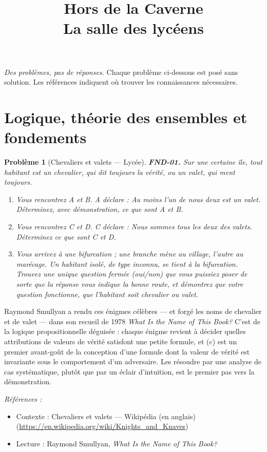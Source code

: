 \documentclass[11pt]{article}
\title{Hors de la Caverne \\ \Large La salle des lycéens}
\author{}
\date{}
\newtheorem{problem}{Problème}
\newenvironment{refs}{\par\small\noindent\emph{Références :}\begin{itemize}\setlength\itemsep{0pt}}{\end{itemize}\normalsize}
\begin{document}
\maketitle
\noindent\emph{Des problèmes, pas de réponses.} Chaque problème ci-dessous est posé
sans solution. Les références indiquent où trouver les connaissances nécessaires.
\medskip


\section*{Logique, théorie des ensembles et fondements}

\begin{problem}[{Chevaliers et valets --- Lycée}]
\textbf{FND-01.} Sur une certaine île, tout habitant est un \textit{chevalier},
qui dit toujours la vérité, ou un \textit{valet}, qui ment toujours.
\begin{enumerate}
\item[(a)] Vous rencontrez A et B. A déclare :
\og{} Au moins l'un de nous deux est un valet. \fg{} Déterminez, avec démonstration, ce que sont A et B.
\item[(b)] Vous rencontrez C et D.
C déclare : \og{} Nous sommes tous les deux des valets. \fg{} Déterminez ce que sont C et D.
\item[(c)] Vous arrivez à une bifurcation ; une
branche mène au village, l'autre au marécage. Un habitant isolé, de type inconnu, se tient
à la bifurcation. Trouvez une unique question fermée (oui/non) que vous puissiez poser de sorte que
la réponse vous indique la bonne route, et démontrez que votre question fonctionne, que
l'habitant soit chevalier ou valet.
\end{enumerate}

\end{problem}

\noindent Raymond Smullyan a rendu ces énigmes célèbres --- et forgé les noms de chevalier
et de valet --- dans son recueil de 1978 \textit{What Is the Name of This Book?} C'est de la logique
propositionnelle déguisée : chaque énigme revient à décider quelles attributions de valeurs de
vérité satisfont une petite formule, et (c) est un premier avant-goût de la conception d'une
formule dont la valeur de vérité est invariante sous le comportement d'un adversaire. Les
résoudre par une analyse de cas systématique, plutôt que par un éclair d'intuition, est le
premier pas vers la démonstration.

\begin{refs}
\item Contexte : Chevaliers et valets --- Wikipédia (en anglais) (\url{https://en.wikipedia.org/wiki/Knights_and_Knaves})
\item Lecture : Raymond Smullyan, \textit{What Is the Name of This Book?}
\end{refs}
\end{document}
